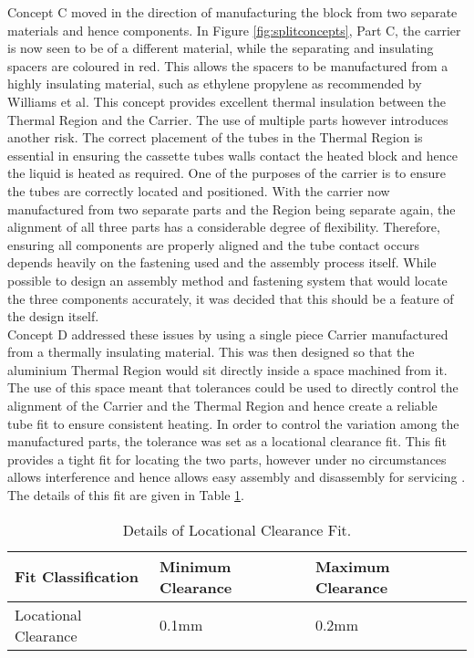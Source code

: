 Concept C moved in the direction of manufacturing the block from two separate materials and hence components. In Figure \ref{fig:splitconcepts}, Part C, the carrier is now seen to be of a different material, while the separating and insulating spacers are coloured in red. This allows the spacers to be manufactured from a highly insulating material, such as ethylene propylene as recommended by Williams et al. This concept provides excellent thermal insulation between the Thermal Region and the Carrier. The use of multiple parts however introduces another risk. The correct placement of the tubes in the Thermal Region is essential in ensuring the cassette tubes walls contact the heated block and hence the liquid is heated as required. One of the purposes of the carrier is to ensure the tubes are correctly located and positioned. With the carrier now manufactured from two separate parts and the Region being separate again, the alignment of all three parts has a considerable degree of flexibility. Therefore, ensuring all components are properly aligned and the tube contact occurs depends heavily on the fastening used and the assembly process itself. While possible to design an assembly method and fastening system that would locate the three components accurately, it was decided that this should be a feature of the design itself.\\

Concept D addressed these issues by using a single piece Carrier manufactured from a thermally insulating material. This was then designed so that the aluminium Thermal Region would sit directly inside a space machined from it. The use of this space meant that tolerances could be used to directly control the alignment of the Carrier and the Thermal Region and hence create a reliable tube fit to ensure consistent heating. In order to control the variation among the manufactured parts, the tolerance was set as a locational clearance fit. This fit provides a tight fit for locating the two parts, however under no circumstances allows interference and hence allows easy assembly and disassembly for servicing \cite{mmto}. The details of this fit are given in Table \ref{tab:fit}.


\begin{table}[h!]
\begin{center}
\begin{tabular}{ p{4.2cm} |  p{4.2cm} | p{4.2cm} }
\hline
Fit Classification & Minimum Clearance & Maximum Clearance\\ \hline \hline
Locational Clearance & 0.1mm & 0.2mm\\ \hline
\end{tabular}
\end{center}
\caption[Fit Tolerance Details.]{Details of Locational Clearance Fit.}
\label{tab:fit}
\end{table}

